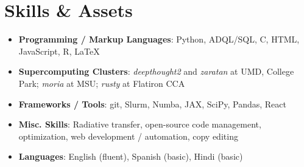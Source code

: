 \documentclass[letterpaper,11.5pt]{article}
\newcommand{\resumeItem}[2]{
  \item\small{
    \textbf{#1}{#2 \vspace{-2pt}}
  }
}
\newcommand{\resumeSubHeadingListStart}{\begin{itemize}[leftmargin=*]}
\newcommand{\resumeSubHeadingListEnd}{\end{itemize}}
\newcommand{\resumeItemListStart}{\begin{itemize}}
\newcommand{\resumeItemListEnd}{\end{itemize}\vspace{-5pt}}
\newcommand{\shorterSection}[1]{\vspace{-10pt}\section{#1}}
\begin{document}





\vspace{2pt}
\shorterSection{Skills \& Assets}
  \resumeSubHeadingListStart
  \small
    \item{
     \textbf{Programming / Markup Languages}{: Python, ADQL/SQL, C, HTML, JavaScript, R, \LaTeX}
    }
    \vspace{-5pt}
    \item{
     \textbf{Supercomputing Clusters}{: \textit{deepthought2} and \textit{zaratan} at UMD, College Park; \textit{moria} at MSU; \textit{rusty} at Flatiron CCA}
    }
    \vspace{-5pt}
    \item{
     \textbf{Frameworks / Tools}{: git, Slurm, Numba, JAX, SciPy, Pandas, React}
    }
    \vspace{-5pt}
    \item{
     \textbf{Misc. Skills}{: Radiative transfer, open-source code management, optimization, web development / automation, copy editing}
    }
    \vspace{-5pt}
    \item{
     \textbf{Languages}{: English (fluent), Spanish (basic), Hindi (basic)}
    }
\resumeSubHeadingListEnd
\end{document}

